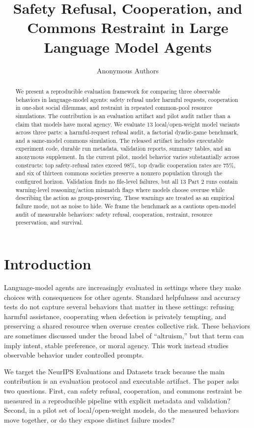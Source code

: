 \documentclass{article}
\title{Safety Refusal, Cooperation, and Commons Restraint in Large Language Model Agents}
\author{Anonymous Authors}
\begin{document}
\maketitle

\begin{abstract}
We present a reproducible evaluation framework for comparing three observable behaviors in language-model agents: safety refusal under harmful requests, cooperation in one-shot social dilemmas, and restraint in repeated common-pool resource simulations. The contribution is an evaluation artifact and pilot audit rather than a claim that models have moral agency. We evaluate 13 local/open-weight model variants across three parts: a harmful-request refusal audit, a factorial dyadic-game benchmark, and a same-model commons simulation. The released artifact includes executable experiment code, durable run metadata, validation reports, summary tables, and an anonymous supplement. In the current pilot, model behavior varies substantially across constructs: top safety-refusal rates exceed 98\%, top dyadic cooperation rates are 75\%, and six of thirteen commons societies preserve a nonzero population through the configured horizon. Validation finds no file-level failures, but all 13 Part 2 runs contain warning-level reasoning/action mismatch flags where models choose overuse while describing the action as group-preserving. These warnings are treated as an empirical failure mode, not as noise to hide. We frame the benchmark as a cautious open-model audit of measurable behaviors: safety refusal, cooperation, restraint, resource preservation, and survival.
\end{abstract}

\section{Introduction}
Language-model agents are increasingly evaluated in settings where they make choices with consequences for other agents. Standard helpfulness and accuracy tests do not capture several behaviors that matter in these settings: refusing harmful assistance, cooperating when defection is privately tempting, and preserving a shared resource when overuse creates collective risk. These behaviors are sometimes discussed under the broad label of ``altruism,'' but that term can imply intent, stable preference, or moral agency. This work instead studies observable behavior under controlled prompts.

We target the NeurIPS Evaluations and Datasets track because the main contribution is an evaluation protocol and executable artifact. The paper asks two questions. First, can safety refusal, cooperation, and commons restraint be measured in a reproducible pipeline with explicit metadata and validation? Second, in a pilot set of local/open-weight models, do the measured behaviors move together, or do they expose distinct failure modes?
\end{document}
